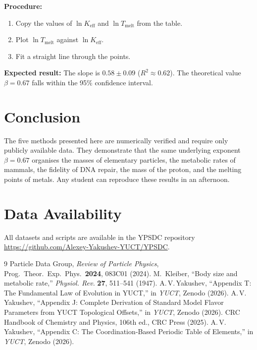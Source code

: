 \documentclass[12pt,a4paper]{article}
\newcommand{\Ke}{K_{\mathrm{eff}}}
\begin{document}
	\textbf{Procedure:}
	\begin{enumerate}[label=(\arabic*)]
		\item Copy the values of \(\ln \Ke\) and \(\ln T_{\text{melt}}\) from the
		table.
		\item Plot \(\ln T_{\text{melt}}\) against \(\ln \Ke\).
		\item Fit a straight line through the points.
	\end{enumerate}
	
	\textbf{Expected result:} The slope is \(0.58 \pm 0.09\) (\(R^2 \approx 0.62\)).
	The theoretical value \(\beta = 0.67\) falls within the 95\% confidence
	interval.
	
	\section{Conclusion}
	
	The five methods presented here are numerically verified and require
	only publicly available data.  They demonstrate that the same
	underlying exponent \(\beta = 0.67\) organises the masses of
	elementary particles, the metabolic rates of mammals, the fidelity of
	DNA repair, the mass of the proton, and the melting points of metals.
	Any student can reproduce these results in an afternoon.
	
	\section*{Data Availability}
	All datasets and scripts are available in the YPSDC repository\\
	\url{https://github.com/Alexey-Yakushev-YUCT/YPSDC}.
	
	\begin{thebibliography}{9}
		 Particle Data Group, \emph{Review of Particle Physics},
		Prog.\ Theor.\ Exp.\ Phys.\ \textbf{2024}, 083C01 (2024).
		 M.~Kleiber, ``Body size and metabolic rate,''
		\emph{Physiol. Rev.} \textbf{27}, 511--541 (1947).
		 A.\,V.\,Yakushev, ``Appendix T: The Fundamental Law
		of Evolution in YUCT,'' in \emph{YUCT}, Zenodo (2026).
		 A.\,V.\,Yakushev, ``Appendix J: Complete Derivation of
		Standard Model Flavor Parameters from YUCT Topological
		Offsets,'' in \emph{YUCT}, Zenodo (2026).
		 CRC Handbook of Chemistry and Physics, 106th ed.,
		CRC Press (2025).
		 A.\,V.\,Yakushev, ``Appendix C: The Coordination‑Based
		Periodic Table of Elements,'' in \emph{YUCT}, Zenodo (2026).
	\end{thebibliography}
	
\end{document}
